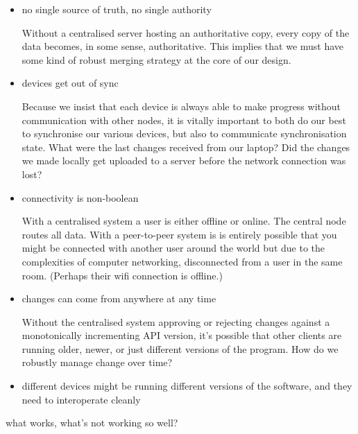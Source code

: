 \documentclass[sigplan,10pt]{acmart}
\begin{document}
\begin{itemize}
	\item no single source of truth, no single authority

	Without a centralised server hosting an authoritative copy, every copy of the data becomes, in some sense, authoritative. This implies that we must have some kind of robust merging strategy at the core of our design.
	\item devices get out of sync

    Because we insist that each device is always able to make progress without communication with other nodes, it is vitally important to both do our best to synchronise our various devices, but also to communicate synchronisation state. What were the last changes received from our laptop? Did the changes we made locally get uploaded to a server before the network connection was lost?  

    \item connectivity is non-boolean

    With a centralised system a user is either offline or online. The central node routes all data. With a peer-to-peer system is is entirely possible that you might be connected with another user around the world but due to the complexities of computer networking, disconnected from a user in the same room. (Perhaps their wifi connection is offline.) 

    \item changes can come from anywhere at any time

    Without the centralised system approving or rejecting changes against a monotonically incrementing API version, it's possible that other clients are running older, newer, or just different versions of the program. How do we robustly manage change over time?
    
    \item different devices might be running different versions of the software, and they need to interoperate cleanly
\end{itemize}


what works, what's not working so well?
\end{document}
